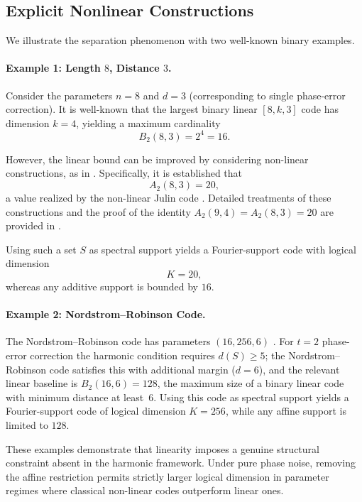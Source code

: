 \documentclass[a4paper,twocolumn,11pt,allowtoday]{quantumarticle}
\theoremstyle{plain}
\theoremstyle{definition}
\theoremstyle{remark}
\begin{document}
\subsection{Explicit Nonlinear Constructions}
\label{subsec:nonlinear_constructions}

We illustrate the separation phenomenon with two well-known
binary examples.

\paragraph{Example 1: Length $8$, Distance $3$.}

Consider the parameters $n=8$ and $d=3$ (corresponding to single phase-error correction).
It is well-known that the largest binary linear $[8,k,3]$ code has dimension $k=4$,
yielding a maximum cardinality
\[
B_2(8,3)=2^{4}=16.
\]

However, the linear bound can be improved by considering non-linear constructions, as in \cite{Nadler1962}. Specifically, it is established that 
\[
A_2(8,3) = 20,
\]
a value realized by the non-linear Julin code \cite{Julin1965}. Detailed treatments of these constructions and the proof of the identity $A_2(9,4) =A_2(8,3)= 20$ are provided in \cite[Example 2.6.5]{HuffmanPless}.


Using such a set $S$ as spectral support yields a Fourier-support code
with logical dimension
\[
K = 20,
\]
whereas any additive support is bounded by $16$.

\paragraph{Example 2: Nordstrom--Robinson Code.}

The Nordstrom--Robinson code has parameters $(16,256,6)$ \cite{NordstromRobinson1967}.
For $t=2$ phase-error correction the harmonic condition requires
$d(S)\ge 5$; the Nordstrom--Robinson code satisfies this with
additional margin ($d=6$), and the relevant linear baseline is
$B_2(16,6)=128$, the maximum size of a binary linear code with
minimum distance at least~$6$.
Using this code as spectral support yields a Fourier-support code
of logical dimension $K=256$, while any affine support is limited
to $128$.

\medskip

These examples demonstrate that linearity imposes a genuine structural
constraint absent in the harmonic framework. Under pure phase noise,
removing the affine restriction permits strictly larger logical
dimension in parameter regimes where classical non-linear codes
outperform linear ones.
\end{document}
